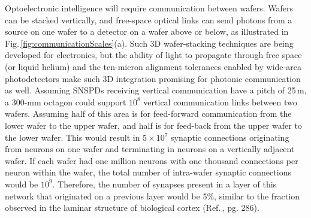 \documentclass[twocolumn]{article}
\begin{document}
\begin{figure}[] 
\end{figure}
Optoelectronic intelligence will require communication between wafers. Wafers can be stacked vertically, and free-space optical links can send photons from a source on one wafer to a detector on a wafer above or below, as illustrated in Fig.\,\ref{fig:communicationScales}(a). Such 3D wafer-stacking techniques are being developed for electronics, but the ability of light to propagate through free space (or liquid helium) and the ten-micron alignment tolerances enabled by wide-area photodetectors \cite{mave2013} make such 3D integration promising for photonic communication as well. Assuming SNSPDs receiving vertical communication have a pitch of 25\,\textmu m, a 300-mm octagon could support $10^8$ vertical communication links between two wafers. Assuming half of this area is for feed-forward communication from the lower wafer to the upper wafer, and half is for feed-back from the upper wafer to the lower wafer. This would result in $5\times10^7$ synaptic connections originating from neurons on one wafer and terminating in neurons on a vertically adjacent wafer. If each wafer had one million neurons with one thousand connections per neuron within the wafer, the total number of intra-wafer synaptic connections would be $10^9$. Therefore, the number of synapses present in a layer of this network that originated on a previous layer would be 5\%, similar to the fraction observed in the laminar structure of biological cortex (Ref.\,\cite{bu2006}, pg. 286).
\end{document}
